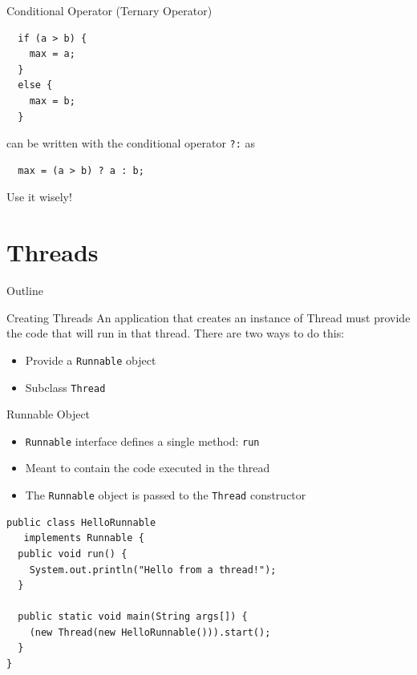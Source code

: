 \begin{frame}[fragile]{Conditional Operator (Ternary Operator)}
  \begin{lstlisting}
  if (a > b) {
    max = a;
  }
  else {
    max = b;
  }    
  \end{lstlisting}


  can be written with the conditional operator \lstinline!?:! as


  \begin{lstlisting}
  max = (a > b) ? a : b;
  \end{lstlisting}


  Use it wisely!
\end{frame}


\section{Threads}

\begin{frame}{Outline}
  \tableofcontents[current]
\end{frame}

\begin{frame}{Creating Threads}
  An application that creates an instance of Thread must provide the
  code that will run in that thread. There are two ways to do this:


  \begin{itemize}
  \item Provide a \lstinline!Runnable! object
  \item Subclass \lstinline!Thread!
  \end{itemize}
\end{frame}

\begin{frame}[fragile]{Runnable Object}
  \begin{itemize}
  \item \lstinline!Runnable! interface defines a single method:
    \lstinline!run!
  \item Meant to contain the code executed in the thread
  \item The \lstinline!Runnable! object is passed to the
    \lstinline!Thread! constructor
  \end{itemize}


  \begin{lstlisting}
public class HelloRunnable 
   implements Runnable {
  public void run() {
    System.out.println("Hello from a thread!");
  }
  
  public static void main(String args[]) {
    (new Thread(new HelloRunnable())).start();
  }
}
  \end{lstlisting}
\end{frame}


